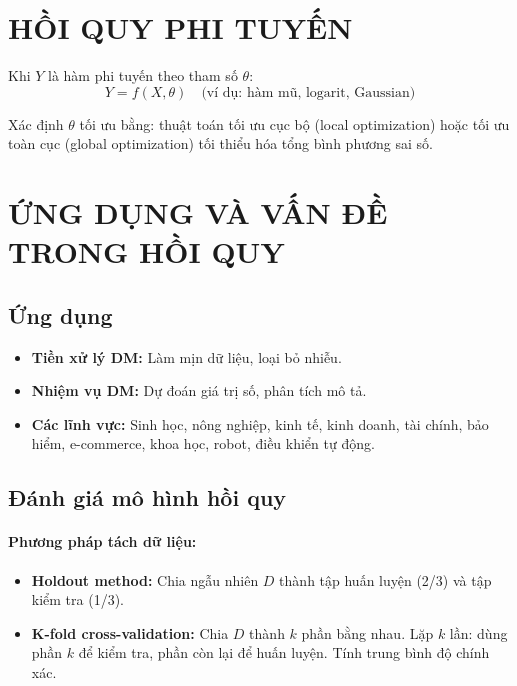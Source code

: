 \documentclass[10pt]{article}
\begin{document}
\section{HỒI QUY PHI TUYẾN}

Khi $Y$ là hàm phi tuyến theo tham số $\theta$:
\[
Y = f(X, \theta) \quad \text{(ví dụ: hàm mũ, logarit, Gaussian)}
\]

Xác định $\theta$ tối ưu bằng: thuật toán tối ưu cục bộ (local optimization) hoặc tối ưu toàn cục (global optimization) tối thiểu hóa tổng bình phương sai số.

\section{ỨNG DỤNG VÀ VẤN ĐỀ TRONG HỒI QUY}

\subsection{Ứng dụng}

\begin{itemize}
    \item \textbf{Tiền xử lý DM:} Làm mịn dữ liệu, loại bỏ nhiễu.
    \item \textbf{Nhiệm vụ DM:} Dự đoán giá trị số, phân tích mô tả.
    \item \textbf{Các lĩnh vực:} Sinh học, nông nghiệp, kinh tế, kinh doanh, tài chính, bảo hiểm, e-commerce, khoa học, robot, điều khiển tự động.
\end{itemize}

\subsection{Đánh giá mô hình hồi quy}

\paragraph{Phương pháp tách dữ liệu:}
\begin{itemize}
    \item \textbf{Holdout method:} Chia ngẫu nhiên $D$ thành tập huấn luyện (2/3) và tập kiểm tra (1/3).
    \item \textbf{K-fold cross-validation:} Chia $D$ thành $k$ phần bằng nhau. Lặp $k$ lần: dùng phần $k$ để kiểm tra, phần còn lại để huấn luyện. Tính trung bình độ chính xác.
\end{itemize}
\end{document}

